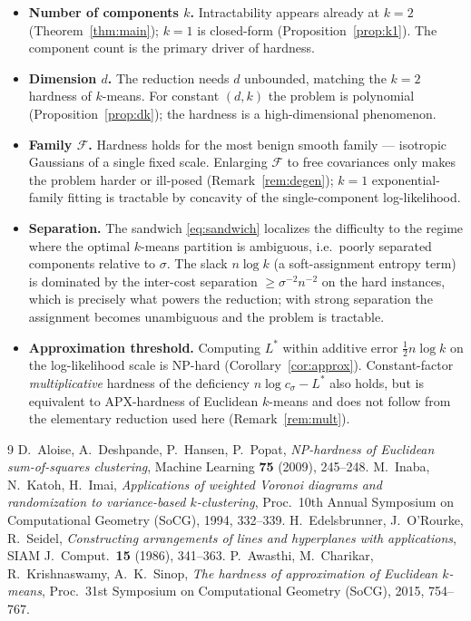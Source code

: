 \documentclass{amsart}
\theoremstyle{plain}
\theoremstyle{definition}
\begin{document}
\begin{itemize}
\item \textbf{Number of components $k$.} Intractability appears already at $k=2$
(Theorem~\ref{thm:main}); $k=1$ is closed-form (Proposition~\ref{prop:k1}). The
component count is the primary driver of hardness.
\item \textbf{Dimension $d$.} The reduction needs $d$ unbounded, matching the
$k=2$ hardness of $k$-means. For constant $(d,k)$ the problem is polynomial
(Proposition~\ref{prop:dk}); the hardness is a high-dimensional phenomenon.
\item \textbf{Family $\mathcal F$.} Hardness holds for the most benign smooth
family --- isotropic Gaussians of a single fixed scale. Enlarging $\mathcal F$ to
free covariances only makes the problem harder or ill-posed
(Remark~\ref{rem:degen}); $k=1$ exponential-family fitting is tractable by
concavity of the single-component log-likelihood.
\item \textbf{Separation.} The sandwich \eqref{eq:sandwich} localizes the
difficulty to the regime where the optimal $k$-means partition is ambiguous, i.e.\
poorly separated components relative to $\sigma$. The slack $n\log k$ (a
soft-assignment entropy term) is dominated by the inter-cost separation
$\ge\sigma^{-2}n^{-2}$ on the hard instances, which is precisely what powers the
reduction; with strong separation the assignment becomes unambiguous and the
problem is tractable.
\item \textbf{Approximation threshold.} Computing $L^{\ast}$ within additive error
$\tfrac12 n\log k$ on the log-likelihood scale is NP-hard
(Corollary~\ref{cor:approx}). Constant-factor \emph{multiplicative} hardness of
the deficiency $n\log c_{\sigma}-L^{\ast}$ also holds, but is equivalent to
APX-hardness of Euclidean $k$-means \cite{ACKS} and does not follow from the
elementary reduction used here (Remark~\ref{rem:mult}).
\end{itemize}

\begin{thebibliography}{9}
 D.~Aloise, A.~Deshpande, P.~Hansen, P.~Popat,
\emph{NP-hardness of Euclidean sum-of-squares clustering},
Machine Learning \textbf{75} (2009), 245--248.
 M.~Inaba, N.~Katoh, H.~Imai,
\emph{Applications of weighted Voronoi diagrams and randomization to
variance-based $k$-clustering}, Proc.\ 10th Annual Symposium on Computational
Geometry (SoCG), 1994, 332--339.
 H.~Edelsbrunner, J.~O'Rourke, R.~Seidel,
\emph{Constructing arrangements of lines and hyperplanes with applications},
SIAM J.\ Comput.\ \textbf{15} (1986), 341--363.
 P.~Awasthi, M.~Charikar, R.~Krishnaswamy, A.~K.~Sinop,
\emph{The hardness of approximation of Euclidean $k$-means},
Proc.\ 31st Symposium on Computational Geometry (SoCG), 2015, 754--767.
\end{thebibliography}
\end{document}
